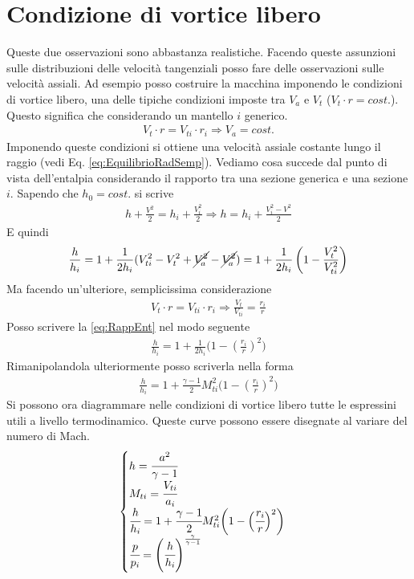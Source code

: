 \section{Condizione di vortice libero}
Queste due osservazioni sono abbastanza realistiche. 
Facendo queste assunzioni sulle distribuzioni delle velocità tangenziali posso fare delle osservazioni sulle velocità assiali. 
Ad esempio posso costruire la macchina imponendo le condizioni di vortice libero, una delle tipiche condizioni imposte tra $V_a$ e $V_t$ ($V_t \cdot r = cost.$).
Questo significa che considerando un mantello $i$ generico.
\begin{align*}
V_t \cdot r = V_{ti} \cdot r_i \Rightarrow V_a = cost.
\end{align*}
Imponendo queste condizioni si ottiene una velocità assiale costante lungo il raggio (vedi Eq. \ref{eq:EquilibrioRadSemp}). Vediamo cosa succede dal punto di vista dell'entalpia considerando il rapporto tra una sezione generica e una sezione $i$. Sapendo che $h_0 = cost.$ si scrive
\begin{align*}
h + \frac{V^2}{2} = h_i + \frac{V_i^2}{2} \Rightarrow h = h_i	+ \frac{V_i^2 - V^2}{2}
\end{align*}
E quindi
\begin{equation}
\frac{h}{h_i} = 1 + \frac{1}{2h_i} (V_{ti}^2-V_t^2 + \cancel{V_a^2} -\cancel{V_a^2}) = 1 + \frac{1}{2h_i} \left( 1- \frac{V_t^2}{V_{ti}^2} \right)
\label{eq:RappEnt}
\end{equation}
Ma facendo un'ulteriore, semplicissima considerazione
\begin{align*}
V_t \cdot r = V_{ti} \cdot r_i \Rightarrow \frac{V_t}{V_{ti}} = \frac{r_i}{r}
\end{align*}
Posso scrivere la \ref{eq:RappEnt} nel modo seguente
\begin{align*}
\boxed{ \frac{h}{h_i} = 1 + \frac{1}{2h_i} \bigg(1 -  \left( \frac{r_i}{r}\right)^2 \bigg)}
\end{align*}
Rimanipolandola ulteriormente posso scriverla nella forma
\begin{align*}
\frac{h}{h_i} = 1 + \frac{\gamma -1}{2} M_{ti}^2 \bigg(1 -  \left( \frac{r_i}{r}\right)^2 \bigg) 
\end{align*}
Si possono ora diagrammare nelle condizioni di vortice libero tutte le espressini utili a livello termodinamico. Queste curve possono essere disegnate al variare del numero di Mach.
\begin{align*}
\begin{cases}
h = \cfrac{a ^ 2}{\gamma - 1} \\
M_{ti} = \cfrac{V_{ti}}{a_i}\\
\cfrac{h}{h_i} = 1 + \cfrac{\gamma -1}{2} M_{ti}^2 \bigg(1 -  \Big( \cfrac{r_i}{r}\Big)^2 \bigg)\\
\cfrac{p}{p_i} = \left( \cfrac{h}{h_i} \right)^{\frac{\gamma}{\gamma - 1}}
\end{cases}
\end{align*}
